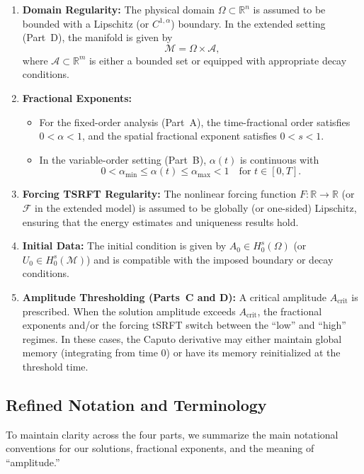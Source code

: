 \documentclass[12pt]{article}
\begin{document}
\begin{enumerate}
  \item \textbf{Domain Regularity:}  
    The physical domain $\Omega\subset\mathbb{R}^n$ is assumed to be bounded with a Lipschitz (or $C^{1,\alpha}$) boundary. In the extended setting (Part~D), the manifold is given by 
    \[
      \mathcal{M} = \Omega \times \mathcal{A},
    \]
    where $\mathcal{A}\subset \mathbb{R}^m$ is either a bounded set or equipped with appropriate decay conditions.
  
  \item \textbf{Fractional Exponents:}  
    \begin{itemize}
      \item For the fixed-order analysis (Part~A), the time-fractional order satisfies $0 < \alpha < 1$, and the spatial fractional exponent satisfies $0 < s < 1$.
      \item In the variable-order setting (Part~B), $\alpha(t)$ is continuous with
            \[
              0 < \alpha_{\min} \le \alpha(t) \le \alpha_{\max} < 1 \quad \text{for } t \in [0,T].
            \]
    \end{itemize}
  
  \item \textbf{Forcing TSRFT Regularity:}  
    The nonlinear forcing function $F:\mathbb{R}\to\mathbb{R}$ (or $\mathcal{F}$ in the extended model) is assumed to be globally (or one-sided) Lipschitz, ensuring that the energy estimates and uniqueness results hold.
  
  \item \textbf{Initial Data:}  
    The initial condition is given by $A_0\in H_0^s(\Omega)$ (or $U_0\in H_0^s(\mathcal{M})$) and is compatible with the imposed boundary or decay conditions.
  
  \item \textbf{Amplitude Thresholding (Parts~C and D):}  
    A critical amplitude $A_{\mathrm{crit}}$ is prescribed. When the solution amplitude exceeds $A_{\mathrm{crit}}$, the fractional exponents and/or the forcing tSRFT switch between the “low” and “high” regimes. In these cases, the Caputo derivative may either maintain global memory (integrating from time $0$) or have its memory reinitialized at the threshold time.
\end{enumerate}

\bigskip


\subsection*{Refined Notation and Terminology}
\label{subsec:notation_table}
To maintain clarity across the four parts, we summarize the main notational conventions for
our solutions, fractional exponents, and the meaning of “amplitude.” 
\end{document}
